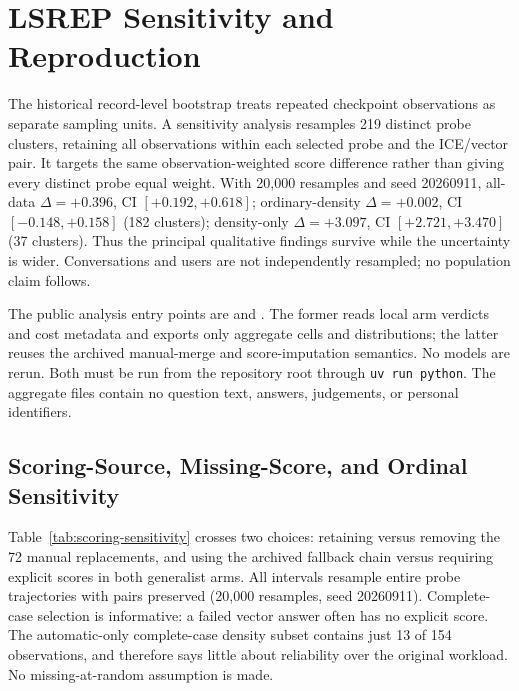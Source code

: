 \documentclass[twoside,11pt]{article}
\begin{document}
\FloatBarrier
\section{LSREP Sensitivity and Reproduction}
\label{app:clustered}
The historical record-level bootstrap treats repeated checkpoint observations as separate sampling units. A sensitivity analysis resamples 219 distinct probe clusters, retaining all observations within each selected probe and the ICE/vector pair. It targets the same observation-weighted score difference rather than giving every distinct probe equal weight. With 20,000 resamples and seed 20260911, all-data $\Delta=+0.396$, CI $[+0.192,+0.618]$; ordinary-density $\Delta=+0.002$, CI $[-0.148,+0.158]$ (182 clusters); density-only $\Delta=+3.097$, CI $[+2.721,+3.470]$ (37 clusters). Thus the principal qualitative findings survive while the uncertainty is wider. Conversations and users are not independently resampled; no population claim follows.

The public analysis entry points are  and . The former reads local arm verdicts and cost metadata and exports only aggregate cells and distributions; the latter reuses the archived manual-merge and score-imputation semantics. No models are rerun. Both must be run from the repository root through \texttt{uv run python}. The aggregate files contain no question text, answers, judgements, or personal identifiers.


\subsection{Scoring-Source, Missing-Score, and Ordinal Sensitivity}
\label{app:scoring}
Table~\ref{tab:scoring-sensitivity} crosses two choices: retaining versus removing the 72 manual replacements, and using the archived fallback chain versus requiring explicit scores in both generalist arms. All intervals resample entire probe trajectories with pairs preserved (20,000 resamples, seed 20260911). Complete-case selection is informative: a failed vector answer often has no explicit score. The automatic-only complete-case density subset contains just 13 of 154 observations, and therefore says little about reliability over the original workload. No missing-at-random assumption is made.

\begin{table}[tbp]
\centering\small



\caption{ICE v2 minus vector generalist under alternative scoring policies. ``Archived'' includes failure assignment and fallback; ``complete'' requires two explicit scores. These are sensitivity analyses of recorded outcomes, not new model runs.}
\label{tab:scoring-sensitivity}
\end{table}
\end{document}
